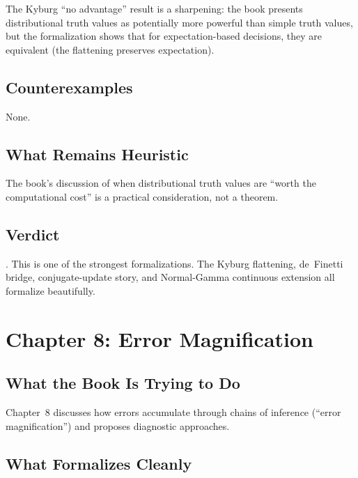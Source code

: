 \documentclass[11pt,openany]{report}
\begin{document}
The Kyburg ``no advantage'' result is a sharpening: the book presents
distributional truth values as potentially more powerful than simple
truth values, but the formalization shows that for expectation-based
decisions, they are equivalent (the flattening preserves expectation).

\section{Counterexamples}

None.

\section{What Remains Heuristic}

The book's discussion of when distributional truth values are
``worth the computational cost'' is a practical consideration,
not a theorem.

\section{Verdict}

\verdictClean{}.  This is one of the strongest formalizations.
The Kyburg flattening, de~Finetti bridge, conjugate-update story,
and Normal-Gamma continuous extension all formalize beautifully.


\chapter{Chapter 8: Error Magnification}
\label{ch:review-ch8}

\section{What the Book Is Trying to Do}

Chapter~8 discusses how errors accumulate through chains of inference
(``error magnification'') and proposes diagnostic approaches.

\section{What Formalizes Cleanly}
\end{document}
